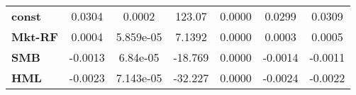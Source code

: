 \begin{center}
\begin{tabular}{lcccccc}
\midrule
\textbf{const}  &       0.0304       &       0.0002       &      123.07     &      0.0000      &       0.0299      &       0.0309       \\
\textbf{Mkt-RF} &       0.0004       &     5.859e-05      &      7.1392     &      0.0000      &       0.0003      &       0.0005       \\
\textbf{SMB}    &      -0.0013       &      6.84e-05      &     -18.769     &      0.0000      &      -0.0014      &      -0.0011       \\
\textbf{HML}    &      -0.0023       &     7.143e-05      &     -32.227     &      0.0000      &      -0.0024      &      -0.0022       \\
\bottomrule
\end{tabular}
\end{center}
